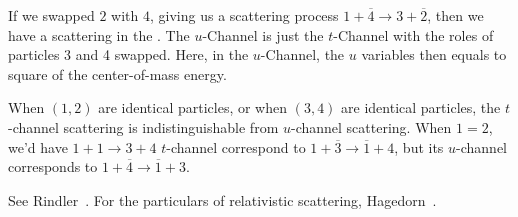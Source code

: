 If we swapped $2$ with $4$, giving us a scattering process
$1+\overline{4}\to3+\overline{2}$,
then we have a scattering in the . The $u$-Channel
is just the $t$-Channel with the roles of particles 3 and 4 swapped.
Here, in the $u$-Channel, the $u$ variables then equals to square of the
center-of-mass energy.

\begin{remark}
When $(1,2)$ are identical particles, or when $(3,4)$ are identical
particles, the $t$-channel scattering is indistinguishable from
$u$-channel scattering. When $1=2$, we'd have $1+1\to3+4$
$t$-channel correspond to $1+\overline{3}\to\overline{1}+4$,
but its $u$-channel corresponds to $1+\overline{4}\to\overline{1}+3$.
\end{remark}

See Rindler~\cite{Rindler:1991sr}. For the particulars of relativistic
scattering, Hagedorn~\cite{Hagedorn:1963hdh}.

\endinput